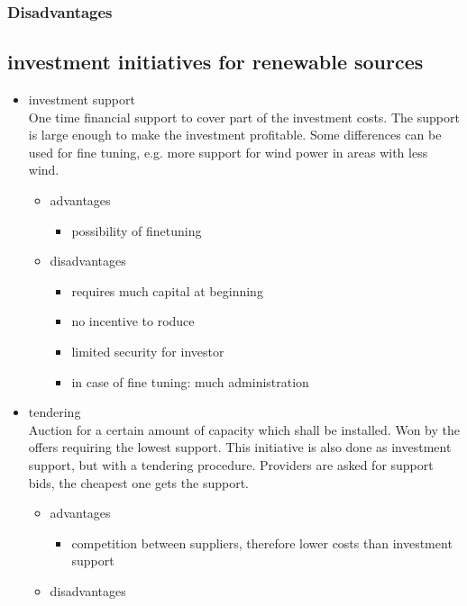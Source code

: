 \documentclass{article}
\begin{document}
\subsubsection{Disadvantages}
\subsection{investment initiatives for renewable sources}
\begin{itemize}
\item investment support\\
One time financial support to cover part of the investment costs.  The support is large enough to make the investment profitable. Some differences can be used for fine tuning, e.g. more support for wind power in areas with less wind.
\begin{itemize}
\item advantages
\begin{itemize}
\item possibility of finetuning
\end{itemize}
\item disadvantages
\begin{itemize}
\item requires much capital at beginning
\item no incentive to roduce
\item limited security for investor
\item in case of fine tuning: much administration
\end{itemize}
\end{itemize}
\item tendering\\
Auction for a certain amount of capacity which shall be installed. Won by the offers requiring the lowest support. This initiative is also done as investment support, but with a tendering procedure. Providers are asked for support bids, the cheapest one gets the support.
\begin{itemize}
\item advantages
\begin{itemize}
\item competition between suppliers, therefore lower costs than investment support
\end{itemize}
\item disadvantages

\end{itemize}
\end{itemize}
\end{document}
